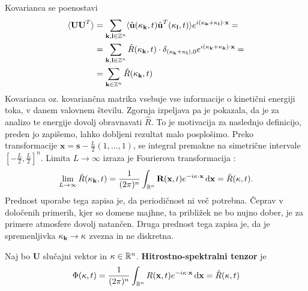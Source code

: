 \documentclass[mat2, tisk]{fmfdelo}
\newcommand{\R}{\mathbb R}
\newcommand{\Z}{\mathbb Z}
\newcommand{\bd}{\textbf}
\begin{document}
Kovarianca se poenostavi 
\begin{align*}
\langle \bd{U} \bd{U}^T\rangle &= \sum_{\bd{k}, \bd{l}\in \Z^{n}} \langle \hat{\bd{u}}(\bd{\text{$\kappa$}}_\bd{k}, t) \hat{\bd{u}}^T(\bd{\text{$\kappa$}}_\bd{l}, t) \rangle e^{i(\bd{\text{$\kappa$}}_\bd{k} + \bd{\text{$\kappa$}}_\bd{l})\cdot \bd{x}} = \\
&= \sum_{\bd{k}, \bd{l}\in \Z^{n}} \hat{R}(\text{\bd{$\kappa$}}_{\bd{k}}, t) \cdot \delta_{(\bd{\text{$\kappa$}}_{\bd{k}} + \bd{\text{$\kappa$}}_{\bd{l}}), 0} e^{i(\bd{\text{$\kappa$}}_\bd{k} + \bd{\text{$\kappa$}}_\bd{k})\cdot \bd{x}} = \\
&= \sum_{\bd{k}\in \Z^{n}} \hat{R}(\text{\bd{$\kappa$}}_{\bd{k}}, t)
\end{align*}
Kovarianca oz. kovariančna matrika vsebuje vse informacije o kinetični energiji toka, 
v danem valovnem številu.
Zgornja izpeljava pa je pokazala, da je za analizo te energije dovolj obravnavati 
$\hat{R}$. To je motivacija za naslednjo definicijo, preden jo zapišemo, 
lahko dobljeni rezultat malo posplošimo. Preko transformacije $\bd{x} = \bd{s} - \frac{L}{2}(1, \dots, 1)$, 
se integral premakne na simetrične intervale 
$\left[-\frac{L}{2}, \frac{L}{2}\right]^n$. Limita $L \rightarrow \infty$ izraza je 
Fourierova transformacija :
\begin{align*}
\lim_{L\rightarrow \infty} \hat{R}(\bd{\text{$\kappa$}}_{\bd{k}}, t) = \frac{1}{(2\pi)^n}\int_{\R^n} \bd{R}(\bd{x}, t) e^{-i\text{\bd{$\kappa$}} \cdot \bd{x}} \dif \bd{x} = \hat{R}(\bd{\text{$\kappa$}}, t).
\end{align*}
Prednost uporabe tega zapisa je, da periodičnost ni več potrebna. Čeprav
v določenih primerih, kjer so domene majhne, ta približek ne bo nujno dober, 
je za primere atmosfere dovolj natančen. Druga prednost tega zapisa je, da je 
spremenljivka $\bd{\text{$\kappa$}}_{\bd{k}} \rightarrow \bd{\text{$\kappa$}}$
zvezna in ne diskretna.

\begin{definicija}
Naj bo $\bd{U}$ slučajni vektor in $\text{\bd{$\kappa$}} \in \R^n$. \bd{Hitrostno-spektralni tenzor} je 
\begin{equation}
\Phi(\text{\bd{$\kappa$}}, t) = \frac{1}{(2\pi)^n}\int_{\R^n} {R}(\bd{x}, t) e^{-i\text{\bd{$\kappa$}} \cdot \bd{x}} \dif \bd{x} = \hat{R}(\bd{\text{$\kappa$}}, t)
\end{equation}
\end{definicija}
\end{document}
